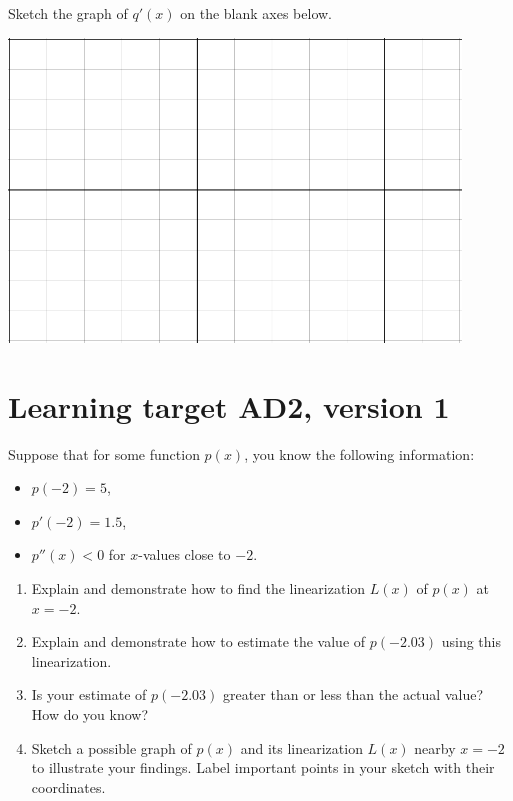 Sketch the graph of $q'(x)$ on the blank axes below.

\begin{center}
    \includegraphics[width=0.9\textwidth]{../images/DFb-v1-blank.png}    
\end{center}


\pagebreak

\section{Learning target AD2, version 1}
Suppose that for some function \(p(x)\), you know the following information:
\begin{itemize}
    \item \(p(-2) = 5\),
    \item \(p'(-2) = 1.5\), 
    \item \(p''(x) < 0\) for \(x\)-values close to \(-2\). 
\end{itemize}

\begin{enumerate}[leftmargin=0pt]
    \item Explain and demonstrate how to find the linearization \(L(x)\) of \(p(x)\) at \(x =-2\). 
    \vfill
    \item Explain and demonstrate how to estimate the value of \(p(-2.03)\) using this linearization. 
    
    \vfill
    \item Is your estimate of \(p(-2.03)\) greater than or less than the actual value? How do you know?
    
    \vfill
    \item Sketch a possible graph of \(p(x)\) and its linearization \(L(x)\) nearby \(x =-2\) to illustrate your findings. Label important points in your sketch with their coordinates.
    
    \vfill
\end{enumerate}

